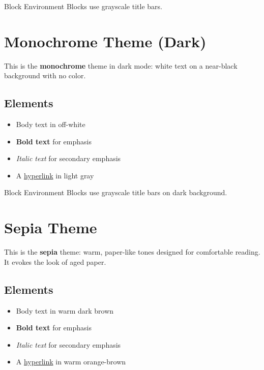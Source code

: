 \documentclass[
    language=english,
    doctype=article,
    institution=none,
    titlestyle=simple,
]{../../omnilatex}
\begin{document}
\begin{block}{Block Environment}
    Blocks use grayscale title bars.
\end{block}

\newpage


\section{Monochrome Theme (Dark)}


This is the \textbf{monochrome} theme in dark mode: white text on a near-black
background with no color.

\subsection{Elements}

\begin{itemize}
    \item Body text in off-white
    \item \textbf{Bold text} for emphasis
    \item \textit{Italic text} for secondary emphasis
    \item A \href{https://github.com/WyattAu/OmniLaTeX-template}{hyperlink} in light gray
\end{itemize}

\begin{block}{Block Environment}
    Blocks use grayscale title bars on dark background.
\end{block}

\newpage


\section{Sepia Theme}


This is the \textbf{sepia} theme: warm, paper-like tones designed for
comfortable reading. It evokes the look of aged paper.

\subsection{Elements}

\begin{itemize}
    \item Body text in warm dark brown
    \item \textbf{Bold text} for emphasis
    \item \textit{Italic text} for secondary emphasis
    \item A \href{https://github.com/WyattAu/OmniLaTeX-template}{hyperlink} in warm orange-brown
\end{itemize}
\end{document}
